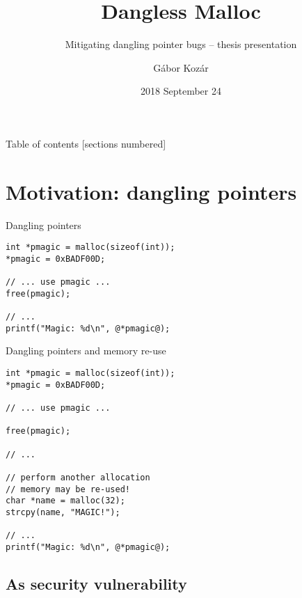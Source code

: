 \documentclass[10pt]{beamer}
\title{Dangless Malloc}
\subtitle{Mitigating dangling pointer bugs -- thesis presentation}
\date{2018 September 24}
\author{Gábor Kozár}
\institute{VU University Amsterdam, University of Amsterdam}
\begin{document}
\maketitle

\begin{frame}{Table of contents}
  [sections numbered]
  \tableofcontents
\end{frame}

\section{Motivation: dangling pointers}

\begin{frame}[fragile]{Dangling pointers}
    \begin{lstlisting}
int *pmagic = malloc(sizeof(int));
*pmagic = 0xBADF00D;

// ... use pmagic ...
free(pmagic);

// ...
printf("Magic: %d\n", @*pmagic@);
    \end{lstlisting}
\end{frame}

\begin{frame}[fragile]{Dangling pointers and memory re-use}
    \begin{lstlisting}
int *pmagic = malloc(sizeof(int));
*pmagic = 0xBADF00D;

// ... use pmagic ...

free(pmagic);

// ...

// perform another allocation
// memory may be re-used!
char *name = malloc(32);
strcpy(name, "MAGIC!");

// ...
printf("Magic: %d\n", @*pmagic@);
    \end{lstlisting}
\end{frame}

\subsection{As security vulnerability}
\end{document}
